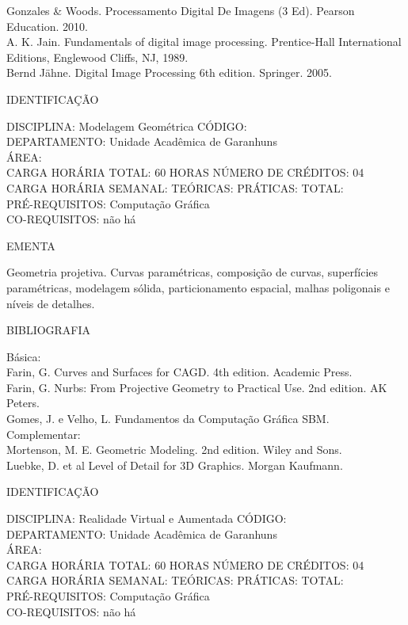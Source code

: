 \documentclass[
	12pt,				%
	openright,			%
  oneside,     %
	a4paper,			%
	english,			%
	french,				%
	spanish,			%
	brazil				%
	]{abntex2}
\begin{document}
\begin{apendicesenv}
Gonzales \& Woods. Processamento Digital De Imagens (3 Ed). Pearson
Education. 2010.\\
A. K. Jain. Fundamentals of digital image processing. Prentice-Hall
International Editions, Englewood Cliffs, NJ, 1989.\\
Bernd Jähne. Digital Image Processing 6th edition. Springer. 2005.

\newpage IDENTIFICAÇÃO

DISCIPLINA: Modelagem Geométrica CÓDIGO:\\ 
DEPARTAMENTO: Unidade Acadêmica de Garanhuns\\ 
ÁREA: \\
CARGA HORÁRIA TOTAL: 60 HORAS NÚMERO DE CRÉDITOS: 04\\
CARGA HORÁRIA SEMANAL: TEÓRICAS: PRÁTICAS: TOTAL: \\
PRÉ-REQUISITOS: Computação Gráfica\\
CO-REQUISITOS: não há

EMENTA 

Geometria projetiva. Curvas paramétricas, composição de curvas,
superfícies paramétricas, modelagem sólida, particionamento espacial,
malhas poligonais e níveis de detalhes.

BIBLIOGRAFIA 

Básica:\\
Farin, G.  Curves and Surfaces for CAGD. 4th edition. Academic
Press.\\
Farin, G. Nurbs: From Projective Geometry to Practical Use. 2nd
edition. AK Peters.\\
Gomes, J. e Velho, L. Fundamentos da Computação Gráfica  SBM.\\
Complementar:\\
Mortenson, M. E.  Geometric Modeling. 2nd edition. Wiley and Sons.\\
Luebke, D. et al  Level of Detail for 3D Graphics. Morgan Kaufmann.

\newpage IDENTIFICAÇÃO

DISCIPLINA: Realidade Virtual e Aumentada CÓDIGO:\\ 
DEPARTAMENTO: Unidade Acadêmica de Garanhuns\\ 
ÁREA: \\
CARGA HORÁRIA TOTAL: 60 HORAS NÚMERO DE CRÉDITOS: 04\\
CARGA HORÁRIA SEMANAL: TEÓRICAS: PRÁTICAS: TOTAL: \\
PRÉ-REQUISITOS: Computação Gráfica\\
CO-REQUISITOS: não há


\end{apendicesenv}
\end{document}
